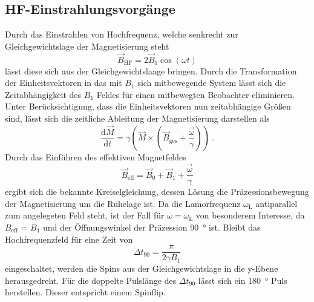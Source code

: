 \subsection{HF-Einstrahlungsvorgänge}%
\label{sub:hf_einstrahlungsvorgaenge}
Durch das Einstrahlen von Hochfrequenz, welche senkrecht zur Gleichgewichtslage
der Magnetisierung steht
\begin{equation}
		\label{eq:bhf}
		\vec{B}_\text{HF} = 2 \vec{B}_1 \cos(\omega t)
\end{equation}
lässt diese sich aus der Gleichgewichtslaage bringen.
Durch die Transformation der Einheitsvektoren in das mit $B_1$ sich mitbewegende
System lässt sich die Zeitabhängigkeit des $B_1$ Feldes für einen mitbewegten
Beobachter eliminieren.
Unter Berücksichtigung, dass die Einheitsvektoren nun zeitabhängige Größen sind,
lässt sich die zeitliche Ableitung der Magnetisierung darstellen als
\begin{equation}
		\label{eq:moment}
		\frac{\text{d}\vec{M}}{\text{d} t} = \gamma \left( \vec{M} \times \left(
		\vec{B}_\text{ges} + \frac{\vec{\omega}}{\gamma} \right) \right) \ .
\end{equation}
Durch das Einführen des effektiven Magnetfeldes
\begin{equation}
		\label{eq:sumB}
		\vec{B}_\text{eff} = \vec{B}_0 + \vec{B}_1 + \frac{\vec{\omega}}{\gamma}
\end{equation}
ergibt sich die bekannte Kreiselgleichung, dessen Lösung die
Präzessionsbewegung der Magnetisierung um die Ruhelage ist.
Da die Lamorfrequenz $\omega_\text{L}$ antiparallel zum angelegeten Feld steht,
ist der Fall für $\omega = \omega_\text{L}$ von besonderem Interesse, da
$B_\text{eff}$ = $B_1$
und der Öffnungswinkel der
Präzession \SI{90}{\degree} ist.
Bleibt das Hochfrequenzfeld für eine Zeit von
\begin{equation}
		\label{eq:90kick}
		\Delta t_{90} = \frac{\pi}{2 \gamma B_1}
\end{equation}
eingeschaltet, werden die Spins aus der Gleichgewichtslage in die y-Ebene
herausgedreht.
Für die doppelte Pulslänge des $\Delta t_{90}$ lässt sich ein \SI{180}{\degree}
Puls herstellen.
Dieser entspricht einem Spinflip.

